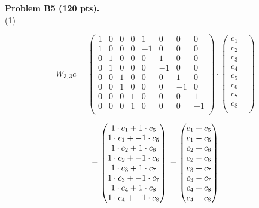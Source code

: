 \documentclass[12pt]{article}
\begin{document}
\medskip
\vspace {0.25cm}\noindent
{\bf Problem B5 (120 pts).} \\
\medskip
(1)

\[
W_{3, 3} c =
\begin{pmatrix}
1  &  0  &  0 & 0 & 1   &  0   & 0    & 0  \\
1  &  0  &  0 & 0 & -1 &  0   & 0    & 0  \\
0   &  1  &  0 & 0 &  0  & 1   & 0    & 0  \\
0   &  1  &  0 & 0 &  0  & -1 & 0    & 0  \\
0   &  0  &  1 & 0 &  0  &  0  & 1    & 0  \\
0   &  0  &  1 & 0 &  0  &  0  & -1  & 0  \\
0   &  0  &  0 & 1 &  0  &  0  & 0    & 1  \\
0   &  0  &  0 & 1 &  0  &  0  & 0    & -1  \\
\end{pmatrix}
\cdot
\begin{pmatrix}
c_1 & \\
c_2 & \\
c_3 & \\
c_4 & \\
c_5 & \\
c_6 & \\
c_7 & \\
c_8 \\
\end{pmatrix}
\]

\[
= 
\begin{pmatrix}
1 \cdot c_1 + 1 \cdot c_5 \\
1 \cdot c_1 + -1 \cdot c_5 \\
1 \cdot c_2 + 1 \cdot c_6 \\
1 \cdot c_2 + -1 \cdot c_6\\
1 \cdot c_3 + 1 \cdot c_7 \\
1 \cdot c_3 + - 1 \cdot c_7 \\
1 \cdot c_4 + 1 \cdot c_8 \\
1 \cdot c_4 + -1 \cdot c_8 \\
\end{pmatrix}
\\ 
= 
\begin{pmatrix}
c_1 + c_5 \\
c_1 - c_5 \\
c_2 + c_6 \\
c_2 - c_6\\
c_3 + c_7 \\
c_3 - c_7 \\
c_4 + c_8 \\
c_4 - c_8 \\
\end{pmatrix}
\]
\end{document}
